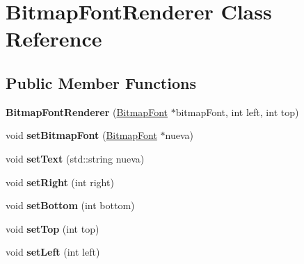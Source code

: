 \hypertarget{class_bitmap_font_renderer}{}\section{Bitmap\+Font\+Renderer Class Reference}
\label{class_bitmap_font_renderer}
\subsection*{Public Member Functions}
\begin{DoxyCompactItemize}
\item 
{\bfseries Bitmap\+Font\+Renderer} (\hyperlink{class_bitmap_font}{Bitmap\+Font} $\ast$bitmap\+Font, int left, int top)\hypertarget{class_bitmap_font_renderer_a65e9126c5691f61c2d992a9ab996b79d}{}\label{class_bitmap_font_renderer_a65e9126c5691f61c2d992a9ab996b79d}

\item 
void {\bfseries set\+Bitmap\+Font} (\hyperlink{class_bitmap_font}{Bitmap\+Font} $\ast$nueva)\hypertarget{class_bitmap_font_renderer_a197dc934c3a667a0d0914044eafc8c79}{}\label{class_bitmap_font_renderer_a197dc934c3a667a0d0914044eafc8c79}

\item 
void {\bfseries set\+Text} (std\+::string nueva)\hypertarget{class_bitmap_font_renderer_a8d0a1192a86938db8d62f6c0e2ba337d}{}\label{class_bitmap_font_renderer_a8d0a1192a86938db8d62f6c0e2ba337d}

\item 
void {\bfseries set\+Right} (int right)\hypertarget{class_bitmap_font_renderer_a3dee9252829f28f6feacb2d1a44afabb}{}\label{class_bitmap_font_renderer_a3dee9252829f28f6feacb2d1a44afabb}

\item 
void {\bfseries set\+Bottom} (int bottom)\hypertarget{class_bitmap_font_renderer_a309059d65d1b9bc39aa0ff7106f6953f}{}\label{class_bitmap_font_renderer_a309059d65d1b9bc39aa0ff7106f6953f}

\item 
void {\bfseries set\+Top} (int top)\hypertarget{class_bitmap_font_renderer_a86a56db51e9b5f0c88b867231668ca00}{}\label{class_bitmap_font_renderer_a86a56db51e9b5f0c88b867231668ca00}

\item 
void {\bfseries set\+Left} (int left)\hypertarget{class_bitmap_font_renderer_a9894805617288d3f5b652dcc30ab5f45}{}\label{class_bitmap_font_renderer_a9894805617288d3f5b652dcc30ab5f45}


\end{DoxyCompactItemize}
